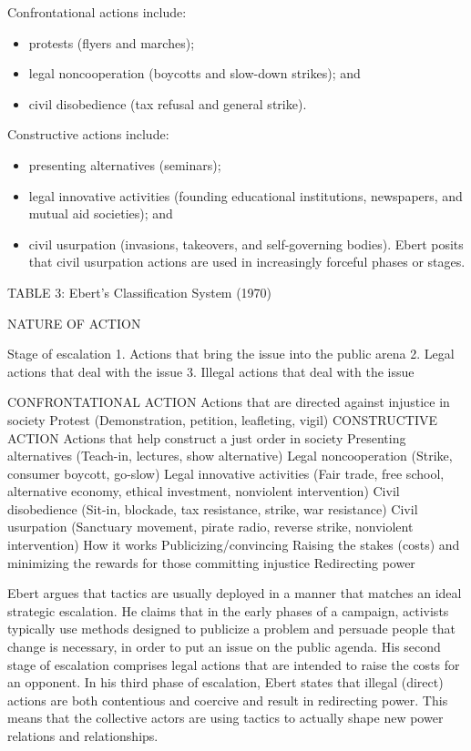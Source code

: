 \documentclass[twoside,a4paper,12pt,fleqn,openany]{extbook}
\begin{document}
Confrontational actions include:

\begin{itemize}
\item protests (flyers and marches);
\item legal noncooperation (boycotts and slow-down strikes); and
\item civil disobedience (tax refusal and general strike).
\end{itemize}

Constructive actions include:

\begin{itemize}
\item presenting alternatives (seminars);
\item legal innovative activities (founding educational institutions, newspapers, and mutual
aid societies); and
\item civil usurpation (invasions, takeovers, and self-governing bodies). Ebert posits that civil
usurpation actions are used in increasingly forceful phases or stages.                                           \end{itemize}

TABLE 3: Ebert’s Classification System (1970)

NATURE OF ACTION

Stage of escalation
1. Actions that bring the issue into the public arena
2. Legal actions that deal with the issue
3. Illegal actions that deal with the issue

CONFRONTATIONAL ACTION
Actions that are directed against injustice in society
Protest
(Demonstration, petition, leafleting, vigil)
CONSTRUCTIVE ACTION
Actions that help construct a just order in society
Presenting alternatives
(Teach-in, lectures, show alternative)
Legal noncooperation
(Strike, consumer boycott, go-slow)
Legal innovative activities
(Fair trade, free school, alternative economy, ethical investment, nonviolent intervention)
Civil disobedience
(Sit-in, blockade, tax resistance, strike, war resistance)
Civil usurpation
(Sanctuary movement, pirate radio, reverse strike, nonviolent intervention)
How it works
Publicizing/convincing
Raising the stakes (costs) and minimizing the rewards for those committing injustice
Redirecting power

Ebert argues that tactics are usually deployed in a manner that matches an ideal strategic escalation. He claims that in the early phases of a campaign, activists typically use methods designed to publicize a problem and persuade people that change is necessary, in order to put an issue on the public agenda. His second stage of escalation comprises legal actions that are intended to raise the costs for an opponent. In his third phase of escalation, Ebert states that illegal (direct) actions are both contentious and coercive and result in redirecting power. This means that the collective actors are using tactics to actually shape new power relations and relationships.
\end{document}
